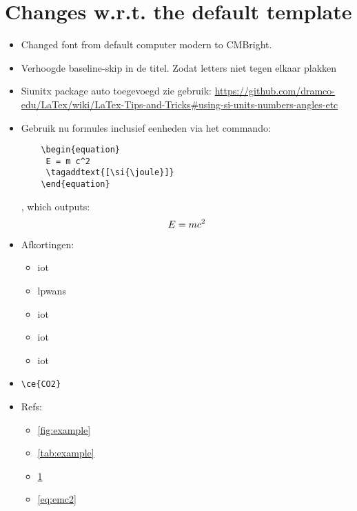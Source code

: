 

\chapter{Changes w.r.t. the default template}\label{ch:introduction}



\begin{itemize}
\item Changed font from default computer modern to CMBright.
\item Verhoogde baseline-skip in de titel. Zodat letters niet tegen elkaar plakken
\item Siunitx package auto toegevoegd zie gebruik: \url{https://github.com/dramco-edu/LaTex/wiki/LaTex-Tips-and-Tricks#using-si-units-numbers-angles-etc}
\item Gebruik nu formules inclusief eenheden via het commando:
\begin{lstlisting}
    \begin{equation}
     E = m c^2
     \tagaddtext{[\si{\joule}]}
    \end{equation}
    \end{lstlisting},
which outputs:
\begin{equation}\label{eq:emc2}
    E = m c^2%
    \tagaddtext{[\si{\joule}]}
\end{equation}
\item Afkortingen:
\begin{itemize}
    \item  \gls{iot}      %
    \item \glspl{lpwan}  %
    \item \acrlong{iot}  %
    \item \acrshort{iot} %
    \item \acrfull{iot}  %
\end{itemize}
\item \verb!\ce{CO2}! 
\item Refs:
\begin{itemize}

    \item \cref{fig:example}
    \item \cref{tab:example}
    \item \cref{ch:introduction}
    \item \cref{eq:emc2}



\end{itemize}
\end{itemize}
